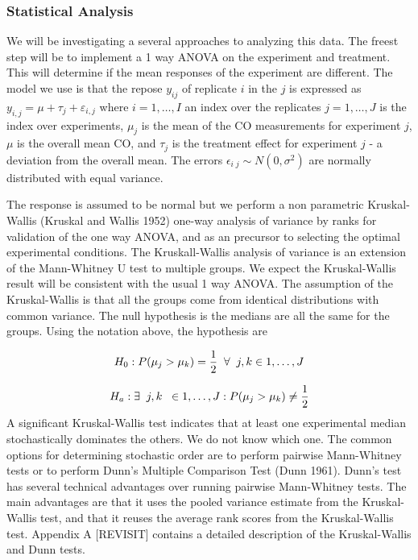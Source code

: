 \documentclass[12pt,]{article}
\begin{document}
\subsubsection{Statistical Analysis}\label{statistical-analysis}

We will be investigating a several approaches to analyzing this data.
The freest step will be to implement a 1 way ANOVA on the experiment and
treatment. This will determine if the mean responses of the experiment
are different. The model we use is that the repose \(y_{ij}\) of
replicate \(i\) in the \(j\) is expressed as
\({\displaystyle y_{i,j}=\mu +\tau _{j}+\varepsilon _{i,j}}\) where
\({\displaystyle i=1,\dotsc ,I}\) an index over the replicates
\({\displaystyle j=1,\dotsc ,J}\) is the index over experiments,
\({\displaystyle \mu _{j}}\) is the mean of the CO measurements for
experiment \(j\),\({\displaystyle \mu }\) is the overall mean CO, and
\(\tau_j\) is the treatment effect for experiment \(j\) - a deviation
from the overall mean. The errors
\(\epsilon_{i \;j} \sim N(0,\sigma^2)\) are normally distributed with
equal variance.

The response is assumed to be normal but we perform a non parametric
Kruskal-Wallis (Kruskal and Wallis 1952) one-way analysis of variance by
ranks for validation of the one way ANOVA, and as an precursor to
selecting the optimal experimental conditions. The Kruskall-Wallis
analysis of variance is an extension of the Mann-Whitney U test to
multiple groups. We expect the Kruskal-Wallis result will be consistent
with the usual 1 way ANOVA. The assumption of the Kruskal-Wallis is that
all the groups come from identical distributions with common variance.
The null hypothesis is the medians are all the same for the groups.
Using the notation above, the hypothesis are

\[H_0 : P(\mu_j > \mu_k) = \frac{1}{2} \;\; \large{\forall} \;\; j,k \in 1,\dotsc ,J\]

\[H_a : \large \exists \;\;j,k \;\;\in 1,\dotsc ,J  :   P(\mu_j > \mu_k) \neq \frac{1}{2} \]
A significant Kruskal-Wallis test indicates that at least one
experimental median stochastically dominates the others. We do not know
which one. The common options for determining stochastic order are to
perform pairwise Mann-Whitney tests or to perform Dunn's Multiple
Comparison Test (Dunn 1961). Dunn's test has several technical
advantages over running pairwise Mann-Whitney tests. The main advantages
are that it uses the pooled variance estimate from the Kruskal-Wallis
test, and that it reuses the average rank scores from the Kruskal-Wallis
test. Appendix A {[}REVISIT{]} contains a detailed description of the
Kruskal-Wallis and Dunn tests.
\end{document}
